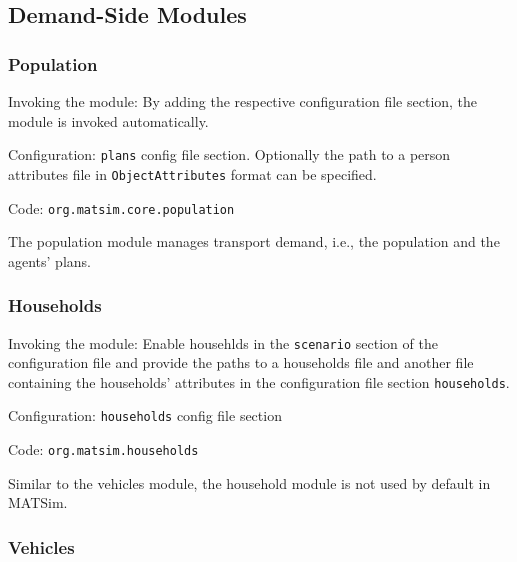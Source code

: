 \subsection{Demand-Side Modules}
\label{sec:dsm}

\subsubsection{Population}
\label{sec:population}
\begin{compactitem}
\item Invoking the module: By adding the respective configuration file section, the module is invoked automatically.
\item Configuration: \lstinline|plans| config file section. Optionally the path to a person attributes file in \lstinline|ObjectAttributes| format can be specified.
\item Code: \lstinline|org.matsim.core.population|
\end{compactitem}

The population module manages transport demand, i.e., the population and the agents' plans.
\subsubsection{Households}
\label{sec:households}
\begin{compactitem}
\item Invoking the module: Enable househlds in the \lstinline|scenario| section of the configuration file and provide the paths to a households file and another file containing the households' attributes in the configuration file section \lstinline|households|.
\item Configuration: \lstinline|households| config file section
\item Code: \lstinline|org.matsim.households|
\end{compactitem}

Similar to the vehicles module, the household module is not used by default in MATSim.

\subsubsection{Vehicles}
\label{sec:vehicles}

